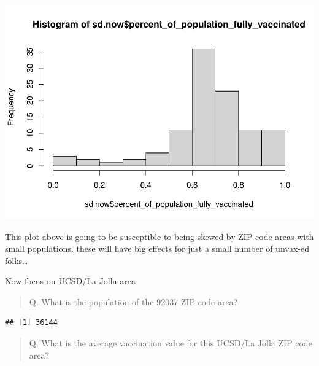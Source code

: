 \documentclass[
]{article}
\newenvironment{Shaded}{\begin{snugshade}}{\end{snugshade}}
\newcommand{\FunctionTok}[1]{\textcolor[rgb]{0.00,0.00,0.00}{#1}}
\newcommand{\NormalTok}[1]{#1}
\newcommand{\OtherTok}[1]{\textcolor[rgb]{0.56,0.35,0.01}{#1}}
\newcommand{\SpecialCharTok}[1]{\textcolor[rgb]{0.00,0.00,0.00}{#1}}
\newcommand{\StringTok}[1]{\textcolor[rgb]{0.31,0.60,0.02}{#1}}
\begin{document}
\includegraphics{Class17_Vax_files/figure-latex/unnamed-chunk-24-1.pdf}

This plot above is going to be susceptible to being skewed by ZIP code
areas with small populations. these will have big effects for just a
small number of unvax-ed folks\ldots{}

Now focus on UCSD/La Jolla area

\begin{quote}
Q. What is the population of the 92037 ZIP code area?
\end{quote}

\begin{Shaded}
\end{Shaded}

\begin{verbatim}
## [1] 36144
\end{verbatim}

\begin{quote}
Q. What is the average vaccination value for this UCSD/La Jolla ZIP code
area?
\end{quote}

\begin{Shaded}
\end{Shaded}
\end{document}
